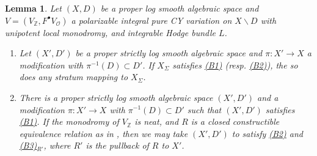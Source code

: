 \documentclass{amsart}
\newcommand{\customref}[2]{\hyperref[#1]{#2}}
\newcommand{\bs}{\backslash}
\newtheorem{lem}[theorem]{Lemma}
\theoremstyle{definition}
\theoremstyle{remark}
\def\bZ{\mathbb{Z}}
\def\cO{\mathcal{O}}
\numberwithin{equation}{section}
\begin{document}
\begin{lem}\label{lem:clarified}Let $(X,D)$ be a proper log smooth algebraic space and $V=(V_\bZ,F^\bullet V_\cO)$ a polarizable integral pure CY variation on $X\bs D$ with unipotent local monodromy, and integrable Hodge bundle $L$.  
\begin{enumerate}
\item Let $(X',D')$ be a proper strictly log smooth algebraic space and $\pi:X'\to X$ a modification with $\pi^{-1}(D)\subset D'$.  If $X_\Sigma$ satisfies \customref{b1}{(B1)} (resp. \customref{b2}{(B2)}), the so does any stratum mapping to $X_\Sigma$.
\item There is a proper strictly log smooth algebraic space $(X',D')$ and a modification $\pi:X'\to X$ with $\pi^{-1}(D)\subset D'$ such that $(X',D')$ satisfies \customref{b1}{(B1)}.  If the monodromy of $V_\bZ$ is neat, and $R$ is a closed constructible equivalence relation as in , then we may take $(X',D')$ to satisfy \customref{b2}{(B2)} and \customref{b3}{(B3)$_{R'}$}, where $R'$ is the pullback of $R$ to $X'$.
\end{enumerate}


\end{lem}
\end{document}
